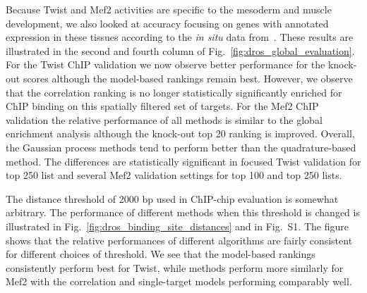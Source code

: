 \documentclass{pnastwo}
\begin{document}
\begin{article}
Because Twist and Mef2 activities are specific to the mesoderm and
muscle development, we also looked at accuracy focusing on genes
with annotated expression in these tissues according to the
\emph{in situ} data from~\cite{Tomancak2002}. These results are
illustrated in the second and fourth column of
Fig.~\ref{fig:dros_global_evaluation}. For the Twist
ChIP validation we now observe better performance for the knock-out
scores although the model-based rankings remain best. However, we
observe that the correlation ranking is no longer statistically
significantly enriched for ChIP binding on this spatially filtered set
of targets. For the Mef2 ChIP validation the relative performance of
all methods is similar to the global enrichment analysis
although the knock-out top 20 ranking is improved.
Overall, the Gaussian process methods tend to perform better than the
quadrature-based method. The differences are statistically significant
in focused Twist validation for top 250 list and several Mef2 validation
settings for top 100 and top 250 lists.


The distance threshold of 2000 bp used in ChIP-chip evaluation is
somewhat arbitrary.  The performance of different methods when this
threshold is changed is illustrated in
Fig.~\ref{fig:dros_binding_site_distances} and in Fig.~S1.
The figure shows that the relative performances of
different algorithms are fairly consistent for different choices of threshold. 
We see that the model-based rankings consistently perform best for Twist, while 
methods perform more similarly for Mef2 with the correlation and single-target models 
performing comparably well.


\end{article}
\end{document}
